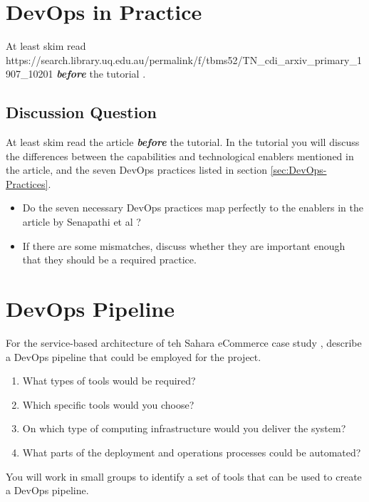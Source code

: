 \documentclass{csse4400}
\begin{document}


\section{DevOps in Practice}
At least skim read 
{https://search.library.uq.edu.au/permalink/f/tbms52/TN_cdi_arxiv_primary_1907_10201}
\textbf{\textit{before}} the tutorial \cite{SenapathiMali2018DCPa}.

\subsection{Discussion Question}
At least skim read the article \textit{\textbf{before}} the tutorial.
In the tutorial you will discuss the differences between the capabilities and technological enablers mentioned in the article,
and the seven DevOps practices listed in section \ref{sec:DevOps-Practices}.
\begin{itemize}
    \item Do the seven necessary DevOps practices map perfectly to the enablers in the article by Senapathi et al \cite{SenapathiMali2018DCPa}?
    \item If there are some mismatches, discuss whether they are important enough that they should be a required practice.
\end{itemize}


\section{DevOps Pipeline}
For the service-based architecture of teh Sahara eCommerce case study \cite{service-based-slides},
describe a DevOps pipeline that could be employed for the project.
\begin{enumerate}
    \item What types of tools would be required?
    \item Which specific tools would you choose?
    \item On which type of computing infrastructure would you deliver the system?
    \item What parts of the deployment and operations processes could be automated?
\end{enumerate}

\noindent
You will work in small groups to identify a set of tools that can be used to create a DevOps pipeline.





\end{document}
